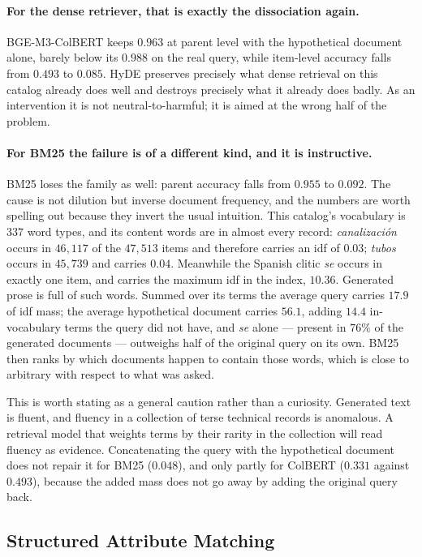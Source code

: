 \documentclass[preprint,12pt]{elsarticle}
\begin{document}
\paragraph{For the dense retriever, that is exactly the dissociation again.}
BGE-M3-ColBERT keeps $0.963$ at parent level with the hypothetical document alone, barely below its $0.988$ on the real query, while item-level accuracy falls from $0.493$ to $0.085$. HyDE preserves precisely what dense retrieval on this catalog already does well and destroys precisely what it already does badly. As an intervention it is not neutral-to-harmful; it is aimed at the wrong half of the problem.

\paragraph{For BM25 the failure is of a different kind, and it is instructive.}
BM25 loses the family as well: parent accuracy falls from $0.955$ to $0.092$. The cause is not dilution but inverse document frequency, and the numbers are worth spelling out because they invert the usual intuition. This catalog's vocabulary is $337$ word types, and its content words are in almost every record: \textit{canalización} occurs in $46{,}117$ of the $47{,}513$ items and therefore carries an idf of $0.03$; \textit{tubos} occurs in $45{,}739$ and carries $0.04$. Meanwhile the Spanish clitic \textit{se} occurs in exactly one item, and carries the maximum idf in the index, $10.36$. Generated prose is full of such words. Summed over its terms the average query carries $17.9$ of idf mass; the average hypothetical document carries $56.1$, adding $14.4$ in-vocabulary terms the query did not have, and \textit{se} alone --- present in $76\%$ of the generated documents --- outweighs half of the original query on its own. BM25 then ranks by which documents happen to contain those words, which is close to arbitrary with respect to what was asked.

This is worth stating as a general caution rather than a curiosity. Generated text is fluent, and fluency in a collection of terse technical records is anomalous. A retrieval model that weights terms by their rarity in the collection will read fluency as evidence. Concatenating the query with the hypothetical document does not repair it for BM25 ($0.048$), and only partly for ColBERT ($0.331$ against $0.493$), because the added mass does not go away by adding the original query back.

\subsection{Structured Attribute Matching}
\label{subsec:structured_results}
\end{document}
